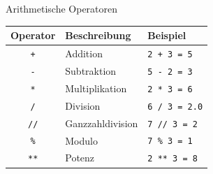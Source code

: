 \documentclass[xelatex,aspectratio=169]{beamer}
\begin{document}
\begin{frame}{Arithmetische Operatoren}
  \begin{table}[]
    \begin{tabular}{cll}
      \toprule
      \textbf{Operator} & \textbf{Beschreibung} & \textbf{Beispiel}    \\ \midrule
      \texttt{+}        & Addition              & \texttt{2 + 3 = 5}   \\
      \texttt{-}        & Subtraktion           & \texttt{5 - 2 = 3}   \\
      \texttt{*}        & Multiplikation        & \texttt{2 * 3 = 6}   \\
      \texttt{/}        & Division              & \texttt{6 / 3 = 2.0} \\
      \texttt{//}       & Ganzzahldivision      & \texttt{7 // 3 = 2}  \\
      \texttt{\%}       & Modulo                & \texttt{7 \% 3 = 1}  \\
      \texttt{**}       & Potenz                & \texttt{2 ** 3 = 8}  \\ \bottomrule
    \end{tabular}
  \end{table}
\end{frame}
\end{document}
